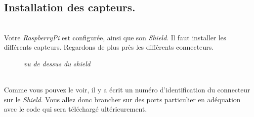 \subsection{Installation des capteurs.}\\

Votre \textit{RaspberryPi} est configurée, ainsi que son \textit{Shield}. Il faut installer les différents capteurs. Regardons de plus près les différents connecteurs.\\

	\begin{figure}[H]
	\begin{center}
	\end{center}
		\caption{ \textit{vu de dessus du shield}}
	\end{figure}\\
	
Comme vous pouvez le voir, il y a écrit un numéro d'identification du connecteur sur le \textit{Shield}. Vous allez donc brancher sur des ports particulier en adéquation avec le code qui sera téléchargé ultérieurement.\\

